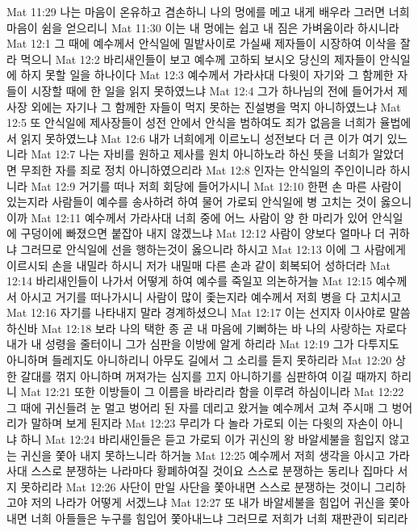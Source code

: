 Mat 11:29  나는 마음이 온유하고 겸손하니 나의 멍에를 메고 내게 배우라 그러면 너희 마음이 쉼을 얻으리니
Mat 11:30  이는 내 멍에는 쉽고 내 짐은 가벼움이라 하시니라
Mat 12:1  그 때에 예수께서 안식일에 밀밭사이로 가실쌔 제자들이 시장하여 이삭을 잘라 먹으니
Mat 12:2  바리새인들이 보고 예수께 고하되 보시오 당신의 제자들이 안식일에 하지 못할 일을 하나이다
Mat 12:3  예수께서 가라사대 다윗이 자기와 그 함께한 자들이 시장할 때에 한 일을 읽지 못하였느냐
Mat 12:4  그가 하나님의 전에 들어가서 제사장 외에는 자기나 그 함께한 자들이 먹지 못하는 진설병을 먹지 아니하였느냐
Mat 12:5  또 안식일에 제사장들이 성전 안에서 안식을 범하여도 죄가 없음을 너희가 율법에서 읽지 못하였느냐
Mat 12:6  내가 너희에게 이르노니 성전보다 더 큰 이가 여기 있느니라
Mat 12:7  나는 자비를 원하고 제사를 원치 아니하노라 하신 뜻을 너희가 알았더면 무죄한 자를 죄로 정치 아니하였으리라
Mat 12:8  인자는 안식일의 주인이니라 하시니라
Mat 12:9  거기를 떠나 저희 회당에 들어가시니
Mat 12:10  한편 손 마른 사람이 있는지라 사람들이 예수를 송사하려 하여 물어 가로되 안식일에 병 고치는 것이 옳으니이까
Mat 12:11  예수께서 가라사대 너희 중에 어느 사람이 양 한 마리가 있어 안식일에 구덩이에 빠졌으면 붙잡아 내지 않겠느냐
Mat 12:12  사람이 양보다 얼마나 더 귀하냐 그러므로 안식일에 선을 행하는것이 옳으니라 하시고
Mat 12:13  이에 그 사람에게 이르시되 손을 내밀라 하시니 저가 내밀매 다른 손과 같이 회복되어 성하더라
Mat 12:14  바리새인들이 나가서 어떻게 하여 예수를 죽일꼬 의논하거늘
Mat 12:15  예수께서 아시고 거기를 떠나가시니 사람이 많이 좇는지라 예수께서 저희 병을 다 고치시고
Mat 12:16  자기를 나타내지 말라 경계하셨으니
Mat 12:17  이는 선지자 이사야로 말씀하신바
Mat 12:18  보라 나의 택한 종 곧 내 마음에 기뻐하는 바 나의 사랑하는 자로다 내가 내 성령을 줄터이니 그가 심판을 이방에 알게 하리라
Mat 12:19  그가 다투지도 아니하며 들레지도 아니하리니 아무도 길에서 그 소리를 듣지 못하리라
Mat 12:20  상한 갈대를 꺾지 아니하며 꺼져가는 심지를 끄지 아니하기를 심판하여 이길 때까지 하리니
Mat 12:21  또한 이방들이 그 이름을 바라리라 함을 이루려 하심이니라
Mat 12:22  그 때에 귀신들려 눈 멀고 벙어리 된 자를 데리고 왔거늘 예수께서 고쳐 주시매 그 벙어리가 말하며 보게 된지라
Mat 12:23  무리가 다 놀라 가로되 이는 다윗의 자손이 아니냐 하니
Mat 12:24  바리새인들은 듣고 가로되 이가 귀신의 왕 바알세불을 힘입지 않고는 귀신을 쫓아 내지 못하느니라 하거늘
Mat 12:25  예수께서 저희 생각을 아시고 가라사대 스스로 분쟁하는 나라마다 황폐하여질 것이요 스스로 분쟁하는 동리나 집마다 서지 못하리라
Mat 12:26  사단이 만일 사단을 쫓아내면 스스로 분쟁하는 것이니 그리하고야 저의 나라가 어떻게 서겠느냐
Mat 12:27  또 내가 바알세불을 힘입어 귀신을 쫓아 내면 너희 아들들은 누구를 힘입어 쫓아내느냐 그러므로 저희가 너희 재판관이 되리라
